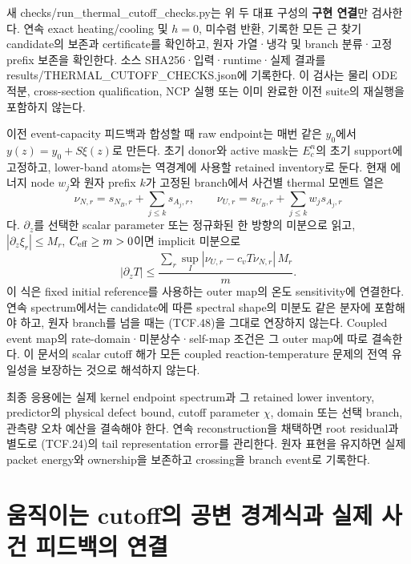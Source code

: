 \documentclass[11pt,a4paper]{article}
\begin{document}
새 checks/run\_thermal\_cutoff\_checks.py는 위 두 대표 구성의 \textbf{구현 연결}만 검사한다. 연속 exact heating/cooling 및 \(h=0\), 미수렴 반환, 기록한 모든 근 찾기 candidate의 보존과 certificate를 확인하고, 원자 가열·냉각 및 branch 분류·고정 prefix 보존을 확인한다. 소스 SHA256·입력·runtime·실제 결과를 results/THERMAL\_CUTOFF\_CHECKS.json에 기록한다. 이 검사는 물리 ODE 적분, cross-section qualification, NCP 실행 또는 이미 완료한 이전 suite의 재실행을 포함하지 않는다.

이전 event-capacity 피드백과 합성할 때 raw endpoint는 매번 같은 \(y_0\)에서 \(y(z)=y_0+S\xi(z)\)로 만든다. 초기 donor와 active mask는 \(E_c^n\)의 초기 support에 고정하고, lower-band atoms는 역경계에 사용할 retained inventory로 둔다. 현재 에너지 node \(w_j\)와 원자 prefix \(k\)가 고정된 branch에서 사건별 thermal 모멘트 열은 \[
\nu_{N,r}=s_{N_B,r}+\sum_{j\le k}s_{A_j,r},\qquad
\nu_{U,r}=s_{U_B,r}+\sum_{j\le k}w_js_{A_j,r}
\tag{TCF.47}
\] 다. \(\partial_z\)를 선택한 scalar parameter 또는 정규화된 한 방향의 미분으로 읽고, \(|\partial_z\xi_r|\le M_r\), \(C_{\rm eff}\ge m>0\)이면 implicit 미분으로 \[
|\partial_zT|\le
\frac{\sum_r\sup_I|\nu_{U,r}-c_vT\nu_{N,r}|\,M_r}{m}.
\tag{TCF.48}
\] 이 식은 fixed initial reference를 사용하는 outer map의 온도 sensitivity에 연결한다. 연속 spectrum에서는 candidate에 따른 spectral shape의 미분도 같은 분자에 포함해야 하고, 원자 branch를 넘을 때는 (TCF.48)을 그대로 연장하지 않는다. Coupled event map의 rate-domain·미분상수·self-map 조건은 그 outer map에 따로 결속한다. 이 문서의 scalar cutoff 해가 모든 coupled reaction-temperature 문제의 전역 유일성을 보장하는 것으로 해석하지 않는다.

최종 응용에는 실제 kernel endpoint spectrum과 그 retained lower inventory, predictor의 physical defect bound, cutoff parameter \(\chi\), domain 또는 선택 branch, 관측량 오차 예산을 결속해야 한다. 연속 reconstruction을 채택하면 root residual과 별도로 (TCF.24)의 tail representation error를 관리한다. 원자 표현을 유지하면 실제 packet energy와 ownership을 보존하고 crossing을 branch event로 기록한다.

\hypertarget{uxc6c0uxc9c1uxc774uxb294-cutoffuxc758-uxacf5uxbcc0-uxacbduxacc4uxc2dduxacfc-uxc2e4uxc81c-uxc0acuxac74-uxd53cuxb4dcuxbc31uxc758-uxc5f0uxacb0}{%
\section{움직이는 cutoff의 공변 경계식과 실제 사건 피드백의 연결}\label{uxc6c0uxc9c1uxc774uxb294-cutoffuxc758-uxacf5uxbcc0-uxacbduxacc4uxc2dduxacfc-uxc2e4uxc81c-uxc0acuxac74-uxd53cuxb4dcuxbc31uxc758-uxc5f0uxacb0}}
\end{document}
